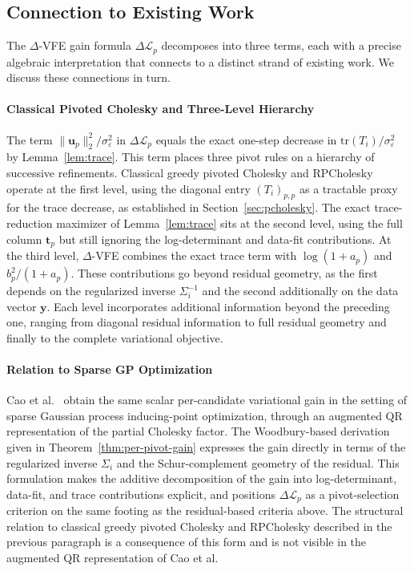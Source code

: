 \documentclass[onefignum,onetabnum]{siamart250211}
\newcommand{\tr}{\mathrm{tr}}
\begin{document}
\subsection{Connection to Existing Work}
\label{subsec:connections}

The $\Delta$-VFE gain formula $\Delta\mathcal{L}_p$  decomposes into three terms, each with a precise  algebraic interpretation that connects to a distinct strand of existing work. We discuss these connections in turn.

\paragraph{Classical Pivoted Cholesky and Three-Level Hierarchy}
The term $\|\bm{u}_p\|_2^2/\sigma_\varepsilon^2$ in $\Delta\mathcal{L}_p$ equals the exact one-step  decrease in $\tr(T_i)/\sigma_\varepsilon^2$ by Lemma~\ref{lem:trace}. This term places three pivot rules on a hierarchy of successive refinements. Classical greedy pivoted Cholesky and RPCholesky operate at the first level, using the diagonal entry $(T_i)_{p,p}$ as a tractable proxy for the trace decrease, as established in Section~\ref{sec:pcholesky}. The  exact trace-reduction maximizer of Lemma~\ref{lem:trace}  sits at the second level, using the full column $\bm{t}_p$ but still ignoring the log-determinant and data-fit contributions. At the third level, $\Delta$-VFE combines the exact trace term with $\log(1+a_p)$ and $b_p^2/(1+a_p)$. These contributions go beyond residual geometry, as the first depends on the regularized inverse $\Sigma_i^{-1}$ and the second additionally on the data vector $\bm{y}$. Each level incorporates additional information beyond the preceding one, ranging from diagonal residual information to full residual geometry and finally to the complete variational objective.

\paragraph{Relation to Sparse GP Optimization}
Cao et al.~\cite{cao.2015} obtain the same scalar per-candidate variational gain in the setting of sparse Gaussian process inducing-point optimization, through an augmented QR representation of the partial Cholesky factor. The Woodbury-based derivation given in Theorem~\ref{thm:per-pivot-gain} expresses the gain directly in terms of the regularized inverse $\Sigma_i$ and the Schur-complement geometry of the residual. This formulation makes the additive decomposition of the gain into log-determinant, data-fit, and trace contributions explicit, and positions $\Delta\mathcal{L}_p$ as a pivot-selection criterion on the same footing as the residual-based criteria above. The structural relation to classical greedy pivoted Cholesky and RPCholesky described in the previous paragraph is a consequence of this form and is not visible in the augmented QR representation of Cao et al.
\end{document}

